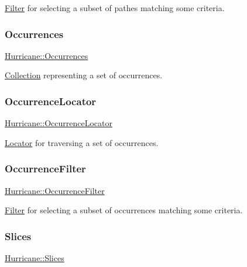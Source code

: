 \hyperlink{classHurricane_1_1Filter}{Filter} for selecting a subset of pathes matching some criteria. \mbox{\label{namespaceHurricane_a1912927c128eee859af62dbe4cbe0a6b}} 
\subsubsection{\texorpdfstring{Occurrences}{Occurrences}}
{\footnotesize\ttfamily \hyperlink{namespaceHurricane_a1912927c128eee859af62dbe4cbe0a6b}{Hurricane\+::\+Occurrences}}

\hyperlink{classHurricane_1_1Collection}{Collection} representing a set of occurrences. \mbox{\label{namespaceHurricane_aa3f9cf43b9c8f3050da0a2549bb3d64d}} 
\subsubsection{\texorpdfstring{Occurrence\+Locator}{OccurrenceLocator}}
{\footnotesize\ttfamily \hyperlink{namespaceHurricane_aa3f9cf43b9c8f3050da0a2549bb3d64d}{Hurricane\+::\+Occurrence\+Locator}}

\hyperlink{classHurricane_1_1Locator}{Locator} for traversing a set of occurrences. \mbox{\label{namespaceHurricane_a4d74662402bde091565f52b77e261560}} 
\subsubsection{\texorpdfstring{Occurrence\+Filter}{OccurrenceFilter}}
{\footnotesize\ttfamily \hyperlink{namespaceHurricane_a4d74662402bde091565f52b77e261560}{Hurricane\+::\+Occurrence\+Filter}}

\hyperlink{classHurricane_1_1Filter}{Filter} for selecting a subset of occurrences matching some criteria. \mbox{\label{namespaceHurricane_aa4a7e8a563c5687621eb5e57ade1706a}} 
\subsubsection{\texorpdfstring{Slices}{Slices}}
{\footnotesize\ttfamily \hyperlink{namespaceHurricane_aa4a7e8a563c5687621eb5e57ade1706a}{Hurricane\+::\+Slices}}

